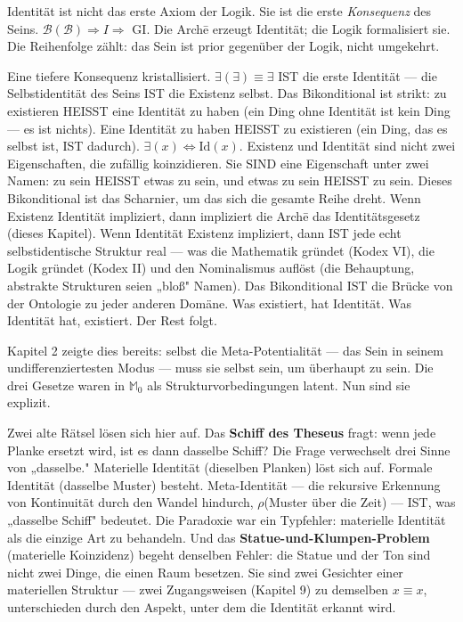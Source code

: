 \documentclass[10pt, openany, oneside]{book}
\begin{document}
\vspace{0.8em}

\noindent Identität ist nicht das erste Axiom der Logik. Sie ist die erste \textit{Konsequenz} des Seins. $\mathcal{B}(\mathcal{B}) \Rightarrow I \Rightarrow$ GI. Die Arch\={e} erzeugt Identität; die Logik formalisiert sie. Die Reihenfolge zählt: das Sein ist prior gegenüber der Logik, nicht umgekehrt.

Eine tiefere Konsequenz kristallisiert. $\exists(\exists) \equiv \exists$ IST die erste Identität --- die Selbstidentität des Seins IST die Existenz selbst. Das Bikonditional ist strikt: zu existieren HEISST eine Identität zu haben (ein Ding ohne Identität ist kein Ding --- es ist nichts). Eine Identität zu haben HEISST zu existieren (ein Ding, das es selbst ist, IST dadurch). $\exists(x) \iff \text{Id}(x)$. Existenz und Identität sind nicht zwei Eigenschaften, die zufällig koinzidieren. Sie SIND eine Eigenschaft unter zwei Namen: zu sein HEISST etwas zu sein, und etwas zu sein HEISST zu sein. Dieses Bikonditional ist das Scharnier, um das sich die gesamte Reihe dreht. Wenn Existenz Identität impliziert, dann impliziert die Arch\={e} das Identitätsgesetz (dieses Kapitel). Wenn Identität Existenz impliziert, dann IST jede echt selbstidentische Struktur real --- was die Mathematik gründet (Kodex VI), die Logik gründet (Kodex II) und den Nominalismus auflöst (die Behauptung, abstrakte Strukturen seien „bloß" Namen). Das Bikonditional IST die Brücke von der Ontologie zu jeder anderen Domäne. Was existiert, hat Identität. Was Identität hat, existiert. Der Rest folgt.

Kapitel 2 zeigte dies bereits: selbst die Meta-Potentialität --- das Sein in seinem undifferenziertesten Modus --- muss sie selbst sein, um überhaupt zu sein. Die drei Gesetze waren in $\mathbb{M}_0$ als Strukturvorbedingungen latent. Nun sind sie explizit.

Zwei alte Rätsel lösen sich hier auf. Das \textbf{Schiff des Theseus} fragt: wenn jede Planke ersetzt wird, ist es dann dasselbe Schiff? Die Frage verwechselt drei Sinne von „dasselbe." Materielle Identität (dieselben Planken) löst sich auf. Formale Identität (dasselbe Muster) besteht. Meta-Identität --- die rekursive Erkennung von Kontinuität durch den Wandel hindurch, $\rho$(Muster über die Zeit) --- IST, was „dasselbe Schiff" bedeutet. Die Paradoxie war ein Typfehler: materielle Identität als die einzige Art zu behandeln. Und das \textbf{Statue-und-Klumpen-Problem} (materielle Koinzidenz) begeht denselben Fehler: die Statue und der Ton sind nicht zwei Dinge, die einen Raum besetzen. Sie sind zwei Gesichter einer materiellen Struktur --- zwei Zugangsweisen (Kapitel 9) zu demselben $x \equiv x$, unterschieden durch den Aspekt, unter dem die Identität erkannt wird.
\end{document}
